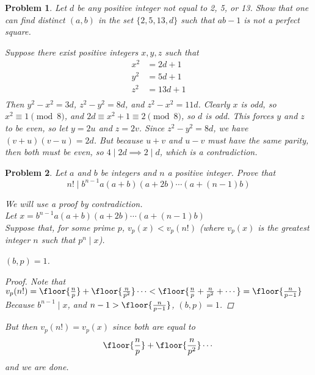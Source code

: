 \documentclass[12pt]{scrartcl}
\newtheorem{a_problem}{Problem}
\begin{document}
\begin{a_problem}
Let $d$ be any positive integer not equal to 2, 5, or 13. Show that one can find distinct $(a,b)$ in the set $\{2,5,13,d\}$ such that $ab-1$ is not a perfect square.
	\begin{soln}
		Suppose there exist positive integers $x,y,z$ such that
		\begin{align*}
			x^2 &= 2d+1 \\
			y^2 &= 5d+1 \\
			z^2 &= 13d+1 \\
		\end{align*}
		Then $y^2-x^2 = 3d$, $z^2 - y^2 = 8d$, and $z^2 - x^2 = 11d$.
		Clearly $x$ is odd, so $x^2 \equiv 1 \pmod 8$, and $2d \equiv x^2 + 1 \equiv 2 \pmod 8$, so $d$ is odd. This forces $y$ and $z$ to be even, so let $y=2u$ and $z=2v$. Since $z^2 - y^2 = 8d$, we have $(v+u)(v-u) = 2d$. But because $u+v$ and $u-v$ must have the same parity, then both must be even, so $4 \mid 2d \implies 2 \mid d$, which is a contradiction.
			
	\end{soln}
\end{a_problem}

\begin{a_problem}
	Let $a$ and $b$ be integers and $n$ a positive integer. Prove that 
	\[n! \mid b^{n-1}a(a+b)(a+2b)\cdots(a+(n-1)b)\]
	\begin{soln}
		We will use a proof by contradiction. \\
		Let $x=b^{n-1}a(a+b)(a+2b)\cdots(a+(n-1)b)$ \\
		Suppose that, for some prime $p$, $v_p(x) < v_p(n!)$ (where $v_p(x)$ is the greatest integer $n$ such that $p^n \mid x$).
		\begin{claim*}
			$(b,p) = 1$.
		\end{claim*}
		\begin{proof}
			Note that $v_p(n!) = \floor{\frac{n}{p}}+ \floor{\frac{n}{p^2}}
			\cdots < \floor{\frac np + \frac n{p^2} + \cdots}
			= \floor{\frac {n}{p-1}}$ \\
	Because $b^{n-1} \mid x$, and $n-1 > \floor{\frac n{p-1}}$, 
	$(b,p) = 1$.
		\end{proof}
		But then $v_p(n!) = v_p(x)$ since both are equal to
		\[\floor{\frac np } + \floor{\frac n{p^2}} \cdots \]
		and we are done.
	\end{soln}
\end{a_problem}
\end{document}
